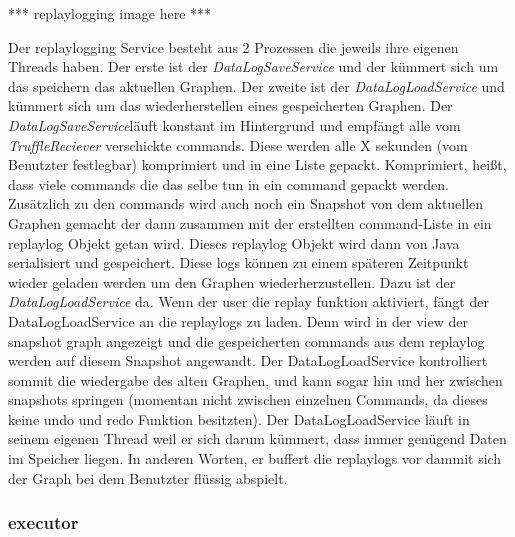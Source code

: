     *** replaylogging image here ***
    \newline
    \newline

    Der replaylogging Service besteht aus 2 Prozessen die jeweils ihre eigenen Threads haben.
    Der erste ist der \textit{DataLogSaveService} und der kümmert sich um das speichern das aktuellen
    Graphen. Der zweite ist der \textit{DataLogLoadService} und kümmert sich um das
    wiederherstellen eines gespeicherten Graphen.
    \newline
    \newline
    Der \textit{DataLogSaveService}läuft konstant im Hintergrund und empfängt alle
    vom \textit{TruffleReciever} verschickte \glspl{command}. Diese werden alle X
    sekunden (vom Benutzter festlegbar) komprimiert und in eine Liste gepackt.
    Komprimiert, heißt, dass viele \glspl{command} die das selbe tun in ein \gls{command}
    gepackt werden. Zusätzlich zu den \glspl{command} wird auch noch ein Snapshot
    von dem aktuellen Graphen gemacht der dann zusammen mit der erstellten
    \gls{command}-Liste in ein \gls{replaylog} Objekt getan wird. Dieses
    \gls{replaylog} Objekt wird dann von Java serialisiert und gespeichert.
    \newline
    \newline
    Diese logs können zu einem späteren Zeitpunkt wieder geladen werden um den
    Graphen wiederherzustellen. Dazu ist der \textit{DataLogLoadService} da. Wenn
    der user die replay funktion aktiviert, fängt der DataLogLoadService an die
    \glspl{replaylog} zu laden. Denn wird in der view der snapshot graph angezeigt
    und die gespeicherten \glspl{command} aus dem \gls{replaylog} werden auf
    diesem Snapshot angewandt. Der DataLogLoadService kontrolliert sommit die
    wiedergabe des alten Graphen, und kann sogar hin und her zwischen snapshots
    springen (momentan nicht zwischen einzelnen Commands, da dieses keine undo
    und redo Funktion besitzten).
    \newline
    \newline
    Der DataLogLoadService läuft in seinem eigenen Thread weil er sich darum
    kümmert, dass immer genügend Daten im Speicher liegen. In anderen Worten, er
    buffert die replaylogs vor dammit sich der Graph bei dem Benutzter flüssig
    abspielt.  

    \subsubsection{executor}
    \label{subsubsec:executor}

